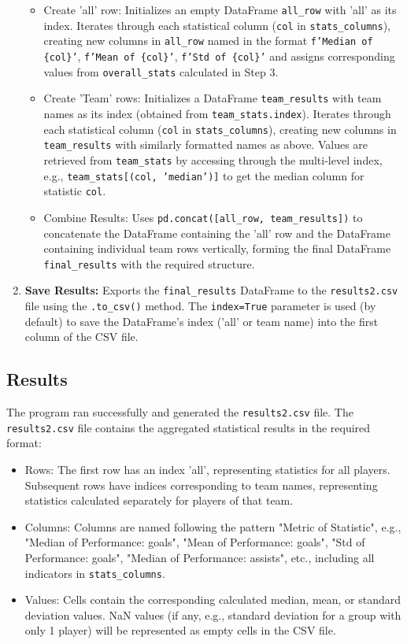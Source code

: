 \documentclass[12pt, a4paper]{report}
\begin{document}
\begin{enumerate}[label=\textbf{Step \arabic*:}, leftmargin=*]
    \begin{itemize}[leftmargin=0em]
        \item Create 'all' row: Initializes an empty DataFrame \texttt{all\_row} with 'all' as its index. Iterates through each statistical column (\texttt{col} in \texttt{stats\_columns}), creating new columns in \texttt{all\_row} named in the format \texttt{f'Median of \{col\}'}, \texttt{f'Mean of \{col\}'}, \texttt{f'Std of \{col\}'} and assigns corresponding values from \texttt{overall\_stats} calculated in Step 3.
        \item Create 'Team' rows: Initializes a DataFrame \texttt{team\_results} with team names as its index (obtained from \texttt{team\_stats.index}). Iterates through each statistical column (\texttt{col} in \texttt{stats\_columns}), creating new columns in \texttt{team\_results} with similarly formatted names as above. Values are retrieved from \texttt{team\_stats} by accessing through the multi-level index, e.g., \texttt{team\_stats[(col, 'median')]} to get the median column for statistic \texttt{col}.
        \item Combine Results: Uses \texttt{pd.concat([all\_row, team\_results])} to concatenate the DataFrame containing the 'all' row and the DataFrame containing individual team rows vertically, forming the final DataFrame \texttt{final\_results} with the required structure.
    \end{itemize}
    \item \textbf{Save Results:}
    Exports the \texttt{final\_results} DataFrame to the \texttt{results2.csv} file using the \texttt{.to\_csv()} method.
    The \texttt{index=True} parameter is used (by default) to save the DataFrame's index ('all' or team name) into the first column of the CSV file.
\end{enumerate}

\subsection{Results}
The program ran successfully and generated the \texttt{results2.csv} file.
The \texttt{results2.csv} file contains the aggregated statistical results in the required format:
\begin{itemize}
    \item Rows: The first row has an index 'all', representing statistics for all players. Subsequent rows have indices corresponding to team names, representing statistics calculated separately for players of that team.
    \item Columns: Columns are named following the pattern "Metric of Statistic", e.g., "Median of Performance: goals", "Mean of Performance: goals", "Std of Performance: goals", "Median of Performance: assists", etc., including all indicators in \texttt{stats\_columns}.
    \item Values: Cells contain the corresponding calculated median, mean, or standard deviation values. NaN values (if any, e.g., standard deviation for a group with only 1 player) will be represented as empty cells in the CSV file.
\end{itemize}
\end{document}
